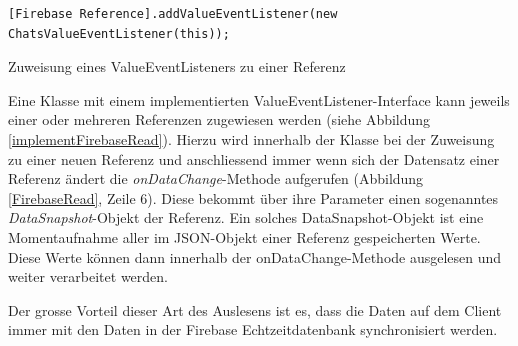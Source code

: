 \documentclass[../main.tex]{subfiles}
\begin{document}
\begin{code}
	\begin{center}
		\begin{verbatim}
[Firebase Reference].addValueEventListener(new ChatsValueEventListener(this));
		\end{verbatim}
		\caption{Zuweisung eines ValueEventListeners zu einer Referenz}
		\label{implementFirebaseRead}
	\end{center}
\end{code}
	
	Eine Klasse mit einem implementierten ValueEventListener-Interface \newline kann jeweils einer oder mehreren Referenzen zugewiesen werden (siehe Abbildung \ref{implementFirebaseRead}). Hierzu wird innerhalb der Klasse bei der Zuweisung zu einer neuen Referenz und anschliessend immer wenn sich der Datensatz einer Referenz ändert die \emph{onDataChange}-Methode aufgerufen (Abbildung \ref{FirebaseRead}, Zeile 6). Diese bekommt über ihre Parameter einen sogenanntes \emph{DataSnapshot}-Objekt der Referenz. Ein solches DataSnapshot-Objekt ist eine Momentaufnahme aller im JSON-Objekt einer Referenz gespeicherten Werte. Diese Werte können dann innerhalb der onDataChange-Methode ausgelesen und weiter verarbeitet werden.
	
	Der grosse Vorteil dieser Art des Auslesens ist es, dass die Daten auf dem Client immer mit den Daten in der Firebase Echtzeitdatenbank synchronisiert werden.
\end{document}
